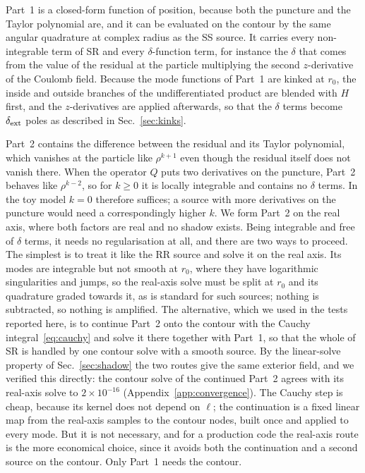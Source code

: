 \documentclass[aps,prd,twocolumn,superscriptaddress,nofootinbib,floatfix]{revtex4-2}
\newcommand{\dext}{\delta_{\rm ext}}
\begin{document}
Part~1 is a closed-form function of position, because both the puncture and the Taylor polynomial are, and it can be evaluated on the contour by the same angular quadrature at complex radius as the SS source.
It carries every non-integrable term of SR and every $\delta$-function term, for instance the $\delta$ that comes from the value of the residual at the particle multiplying the second $z$-derivative of the Coulomb field.
Because the mode functions of Part~1 are kinked at $r_0$, the inside and outside branches of the undifferentiated product are blended with $H$ first, and the $z$-derivatives are applied afterwards, so that the $\delta$ terms become $\dext$ poles as described in Sec.~\ref{sec:kinks}.

Part~2 contains the difference between the residual and its Taylor polynomial, which vanishes at the particle like $\rho^{k+1}$ even though the residual itself does not vanish there.
When the operator $Q$ puts two derivatives on the puncture, Part~2 behaves like $\rho^{k-2}$, so for $k\ge0$ it is locally integrable and contains no $\delta$ terms.
In the toy model $k=0$ therefore suffices; a source with more derivatives on the puncture would need a correspondingly higher $k$.
We form Part~2 on the real axis, where both factors are real and no shadow exists.
Being integrable and free of $\delta$ terms, it needs no regularisation at all, and there are two ways to proceed.
The simplest is to treat it like the RR source and solve it on the real axis.
Its modes are integrable but not smooth at $r_0$, where they have logarithmic singularities and jumps, so the real-axis solve must be split at $r_0$ and its quadrature graded towards it, as is standard for such sources; nothing is subtracted, so nothing is amplified.
The alternative, which we used in the tests reported here, is to continue Part~2 onto the contour with the Cauchy integral~\eqref{eq:cauchy} and solve it there together with Part~1, so that the whole of SR is handled by one contour solve with a smooth source.
By the linear-solve property of Sec.~\ref{sec:shadow} the two routes give the same exterior field, and we verified this directly: the contour solve of the continued Part~2 agrees with its real-axis solve to $2\times10^{-16}$ (Appendix~\ref{app:convergence}).
The Cauchy step is cheap, because its kernel does not depend on $\ell$; the continuation is a fixed linear map from the real-axis samples to the contour nodes, built once and applied to every mode.
But it is not necessary, and for a production code the real-axis route is the more economical choice, since it avoids both the continuation and a second source on the contour.
Only Part~1 needs the contour.
\end{document}
